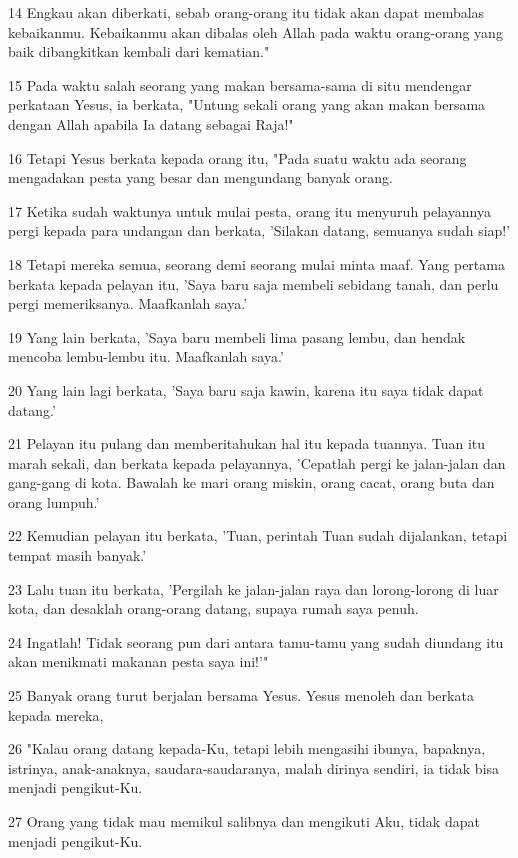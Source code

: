 \par 14 Engkau akan diberkati, sebab orang-orang itu tidak akan dapat membalas kebaikanmu. Kebaikanmu akan dibalas oleh Allah pada waktu orang-orang yang baik dibangkitkan kembali dari kematian."
\par 15 Pada waktu salah seorang yang makan bersama-sama di situ mendengar perkataan Yesus, ia berkata, "Untung sekali orang yang akan makan bersama dengan Allah apabila Ia datang sebagai Raja!"
\par 16 Tetapi Yesus berkata kepada orang itu, "Pada suatu waktu ada seorang mengadakan pesta yang besar dan mengundang banyak orang.
\par 17 Ketika sudah waktunya untuk mulai pesta, orang itu menyuruh pelayannya pergi kepada para undangan dan berkata, 'Silakan datang, semuanya sudah siap!'
\par 18 Tetapi mereka semua, seorang demi seorang mulai minta maaf. Yang pertama berkata kepada pelayan itu, 'Saya baru saja membeli sebidang tanah, dan perlu pergi memeriksanya. Maafkanlah saya.'
\par 19 Yang lain berkata, 'Saya baru membeli lima pasang lembu, dan hendak mencoba lembu-lembu itu. Maafkanlah saya.'
\par 20 Yang lain lagi berkata, 'Saya baru saja kawin, karena itu saya tidak dapat datang.'
\par 21 Pelayan itu pulang dan memberitahukan hal itu kepada tuannya. Tuan itu marah sekali, dan berkata kepada pelayannya, 'Cepatlah pergi ke jalan-jalan dan gang-gang di kota. Bawalah ke mari orang miskin, orang cacat, orang buta dan orang lumpuh.'
\par 22 Kemudian pelayan itu berkata, 'Tuan, perintah Tuan sudah dijalankan, tetapi tempat masih banyak.'
\par 23 Lalu tuan itu berkata, 'Pergilah ke jalan-jalan raya dan lorong-lorong di luar kota, dan desaklah orang-orang datang, supaya rumah saya penuh.
\par 24 Ingatlah! Tidak seorang pun dari antara tamu-tamu yang sudah diundang itu akan menikmati makanan pesta saya ini!'"
\par 25 Banyak orang turut berjalan bersama Yesus. Yesus menoleh dan berkata kepada mereka,
\par 26 "Kalau orang datang kepada-Ku, tetapi lebih mengasihi ibunya, bapaknya, istrinya, anak-anaknya, saudara-saudaranya, malah dirinya sendiri, ia tidak bisa menjadi pengikut-Ku.
\par 27 Orang yang tidak mau memikul salibnya dan mengikuti Aku, tidak dapat menjadi pengikut-Ku.
